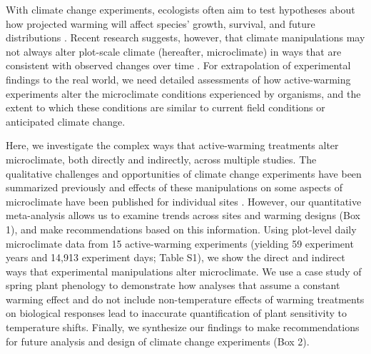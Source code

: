 \documentclass{article}
\begin{document}
\par With climate change experiments, ecologists often aim to test hypotheses about how projected warming will affect species' growth, survival, and future distributions \citep{dukes1999,hobbie1999,morin2010,pelini2011,chuine2012,reich2015,gruner2017}. %
Recent research suggests, however, that climate manipulations may not always alter plot-scale climate (hereafter, microclimate) in ways that are consistent with observed changes over time \citep{wolkovich2012,menke2014,polgar2014,andresen2016}. For extrapolation of experimental findings to the real world, we need detailed assessments of how active-warming experiments alter the microclimate conditions experienced by organisms, and the extent to which these conditions are similar to current field conditions or anticipated climate change. 
\par Here, we investigate the complex ways that active-warming treatments alter microclimate, both directly and indirectly, across multiple studies. The qualitative challenges and opportunities of climate change experiments have been summarized previously \citep[e.g.,][]{deboeck2015} and effects of these manipulations on some aspects of microclimate have been published for individual sites \citep[e.g.,][]{harte1995b,mcdaniel2014,pelini2011}. However, our quantitative meta-analysis allows us to examine trends across sites and warming designs (Box 1), and make recommendations based on this information. Using plot-level daily microclimate data from 15 active-warming experiments (yielding 59 experiment years and 14,913 experiment days; Table S1), we show the direct and indirect ways that experimental manipulations alter microclimate. We use a case study of spring plant phenology to demonstrate how analyses that assume a constant warming effect and do not include non-temperature effects of warming treatments on biological responses lead to inaccurate quantification of plant sensitivity to temperature shifts. Finally, we synthesize our findings to make recommendations for future analysis and design of climate change experiments (Box 2). 
\end{document}
